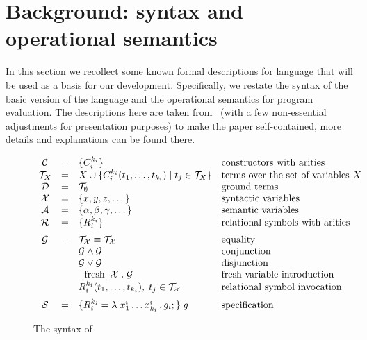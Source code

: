 \section{Background: syntax and operational semantics}
\label{sec:background}

In this section we recollect some known formal descriptions for \mK language that will be used as a basis for our development.
Specifically, we restate the syntax of the basic version of the language and the operational semantics for program evaluation.
The descriptions here are taken from~\cite{CertifiedSemantics} (with a few non-essential adjustments for presentation purposes) to make
the paper self-contained, more details and explanations can be found there.

\begin{figure}[t]
\centering
\[
\begin{array}{ccll}
  \mathcal{C} & = & \{C_i^{k_i}\} & \mbox{constructors with arities} \\
  \mathcal{T}_X & = & X \cup \{C_i^{k_i} (t_1, \dots, t_{k_i}) \mid t_j\in\mathcal{T}_X\} & \mbox{terms over the set of variables $X$} \\
  \mathcal{D} & = & \mathcal{T}_\emptyset & \mbox{ground terms}\\
  \mathcal{X} & = & \{ x, y, z, \dots \} & \mbox{syntactic variables} \\
  \mathcal{A} & = & \{ \alpha, \beta, \gamma, \dots \} & \mbox{semantic variables} \\
  \mathcal{R} & = & \{ R_i^{k_i}\} &\mbox{relational symbols with arities} \\[2mm]
  \mathcal{G} & = & \mathcal{T_X}\equiv\mathcal{T_X}   &  \mbox{equality} \\
              &   & \mathcal{G}\wedge\mathcal{G}     & \mbox{conjunction} \\
              &   & \mathcal{G}\vee\mathcal{G}       &\mbox{disjunction} \\
              &   & \mbox{\lstinline|fresh|}\;\mathcal{X}\;.\;\mathcal{G} & \mbox{fresh variable introduction} \\
              &   & R_i^{k_i} (t_1,\dots,t_{k_i}),\;t_j\in\mathcal{T_X} & \mbox{relational symbol invocation} \\[2mm]
  \mathcal{S} & = & \{R_i^{k_i} = \lambda\;x_1^i\dots x_{k_i}^i\,.\, g_i;\}\; g & \mbox{specification}
\end{array}
\]
\caption{The syntax of \mK}
\label{fig:syntax}
\end{figure}

